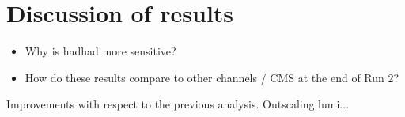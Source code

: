 \section{Discussion of results}%
\label{sec:result_discussion}



\begin{itemize}
\item Why is hadhad more sensitive?
\item How do these results compare to other channels / CMS at the end of Run 2?
\end{itemize}

Improvements with respect to the previous analysis. Outscaling lumi...

